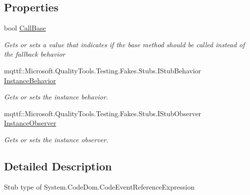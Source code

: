 \subsection*{Properties}
\begin{DoxyCompactItemize}
\item 
bool \hyperlink{class_system_1_1_code_dom_1_1_fakes_1_1_stub_code_event_reference_expression_a2d76de9249d5fd41c6495fbfc2ca3695}{Call\-Base}
\begin{DoxyCompactList}\small\item\em Gets or sets a value that indicates if the base method should be called instead of the fallback behavior\end{DoxyCompactList}\item 
mqttf\-::\-Microsoft.\-Quality\-Tools.\-Testing.\-Fakes.\-Stubs.\-I\-Stub\-Behavior \hyperlink{class_system_1_1_code_dom_1_1_fakes_1_1_stub_code_event_reference_expression_a0d9fb1968698dd98213eef52d7e3e1ec}{Instance\-Behavior}
\begin{DoxyCompactList}\small\item\em Gets or sets the instance behavior.\end{DoxyCompactList}\item 
mqttf\-::\-Microsoft.\-Quality\-Tools.\-Testing.\-Fakes.\-Stubs.\-I\-Stub\-Observer \hyperlink{class_system_1_1_code_dom_1_1_fakes_1_1_stub_code_event_reference_expression_a0af41a74414045cb374dd54e739e584f}{Instance\-Observer}
\begin{DoxyCompactList}\small\item\em Gets or sets the instance observer.\end{DoxyCompactList}\end{DoxyCompactItemize}


\subsection{Detailed Description}
Stub type of System.\-Code\-Dom.\-Code\-Event\-Reference\-Expression




